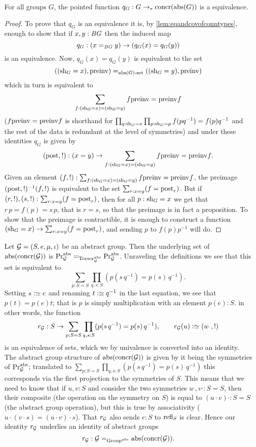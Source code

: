 \begin{lemma}
  \label{lem:Groupsareidentitytypes}
For all groups $G$, the pointed function $q_G:G\to_*\mathrm{concr}(\mathrm{abs}(G))$
is a  equivalence.
\end{lemma}
\begin{proof}
  To prove that $q_G$ is an equivalence it is, by \cref{lem:eqandcovofconntypes}, enough to show that if $x,y:\mathit{B}\mathit{G}$ then the induced map
$$q_G:(x=_{\mathit{B}\mathit{G}}y)\to (q_G(x)=q_G(y))
$$
is an equivalence.
  Now, $q_G(x)=q_G(y)$ is equivalent to the set
$$
((\mathrm{sh}_G=x),\mathrm{preinv})=_{\mathrm{abs}(G)\text{-set}}((\mathrm{sh}_G=y),\mathrm{preinv})$$
which in turn is equivalent to
$$\sum_{f:(\mathrm{sh}_G=x)=(\mathrm{sh}_G=y)}f\mathrm{preinv}=\mathrm{preinv} f
$$
 ($f\mathrm{preinv}=\mathrm{preinv} f$ is shorthand for $\prod_{q:\mathrm{sh}_G=x}\prod_{p:\mathrm{sh}_G=p}f(pq^{-1})=f(p)q^{-1}$ and the rest of the data is redundant at the level of symmetries) and under these identities $q_G$ is given by
$$(\mathrm{post},!):(x=y)\to \sum_{f:(\mathrm{sh}_G=x)=(\mathrm{sh}_G=y)}f\mathrm{preinv}=\mathrm{preinv} f.$$
Given an element
$(f,!):\sum_{f:(\mathrm{sh}_G=x)=(\mathrm{sh}_G=y)}f\mathrm{preinv}=\mathrm{preinv} f$, the preimage
$(\mathrm{post},!)^{-1}(f,!)$ is equivalent to the set
$\sum_{r:x=y}(f=\mathrm{post}_r)$.  But if $(r,!),(s,!): \sum_{r:x=y}(f=\mathrm{post}_r)$, then for all $p:\mathrm{sh}_G=x$ we get that $r\,p=f(p)=s\,p$, that is $r=s$, so that the preimage is in fact a proposition.
To show that the preimage is contractible, it is enough to construct a function $(\mathrm{sh}_G=x)\to \sum_{r:x=y}(f=\mathrm{post}_r)$, and sending $p$ to $f(p)p^{-1}$ will do.
\end{proof}

\begin{example}
  \label{ex:abstrconcrG}
  Let ${\mathcal G}=(S,e,\mu,\iota)$ be an abstract group.
Then the underlying set of $\mathrm{abs}(\mathrm{concr}({\mathcal G}))$ is $\mathrm{Pr}_{{\mathcal G}}^{\mathrm{abs}}=_{\mathrm{Torsor}^{\mathrm{abs}}_{\mathcal G}}\mathrm{Pr}_{{\mathcal G}}^{\mathrm{abs}}$.
Unraveling the definitions we see that this set is equivalent to
$$\sum_{p:S=S}\prod_{q,s:S}(p(s\,q^{-1})=p(s)\,q^{-1}).
$$
Setting $s\defequi e$ and renaming $t\defequi q^{-1}$ in the last equation, we see that $p(t)=p(e)t$; that is $p$ is simply multiplication with an element $p(e):S$.  in other words, the function
$$r_{\agp G}:S\to  \sum_{p:S=S}\prod_{q,s:S}(p(s\,q^{-1})=p(s)\,q^{-1}),\qquad r_{\agp G}(u)\defequi(u\cdot\,,!)
$$
is an equivalence of sets, which we by univalence is converted into an identity.
The abstract group structure of $\mathrm{abs}(\mathrm{concr}({\mathcal G}))$ is given by it being the symmetries of $\mathrm{Pr}_{{\mathcal G}}^{\mathrm{abs}}$; translated to $\sum_{p:S=S}\prod_{q,s:S}(p(s\,q^{-1})=p(s)\,q^{-1})$ this corresponds via the first projection to the symmetries of $S$.
This means that we need to know that if $u,v:S$ and consider the two symmetries $u\cdot,v\cdot:S=S$, then their composite (the operation on the symmetry on $S$) is equal to $(u\cdot v)\cdot:S=S$ (the abstract group operation), but this is true by associativity ($u\cdot(v\cdot s)=(u\cdot v)\cdot s$).  That $r_{\mathcal G}$ also sends $e:S$ to $\mathrm{refl}_{S}$ is clear.
Hence our identity $r_{\mathcal G}$ underlies an identity of abstract groups
$$r_{\mathcal G}:{\mathcal G}=_{\mathrm{Group}^{\mathrm{abs}}}\mathrm{abs}(\mathrm{concr}({\mathcal G})).$$
\end{example}

